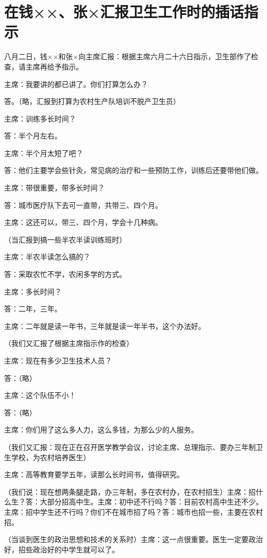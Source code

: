 \section[在钱××、张×汇报卫生工作时的插话指示（一九六五年八月二日）]{在钱××、张×汇报卫生工作时的插话指示}


八月二日，钱××和张×向主席汇报：根据主席六月二十六日指示，卫生部作了检查，请主席再给予指示。

主席：我要讲的都已讲了。你们打算怎么办？

答。（略，汇报到打算为农村生产队培训不脱产卫生员）

主席：训练多长时间？

答：半个月左右。

主席：半个月太短了吧？

答：他们主要学会些针灸，常见病的治疗和一些预防工作，训练后还要带他们做。

主席：带很重要，带多长时间？

答：城市医疗队下去可一直带，共带三、四个月。

主席：这还可以，带三、四个月，学会十几种病。

（当汇报到搞一些半农半读训练班时）

主席：半农半读怎么搞的？

答：采取农忙不学，农闲多学的方式。

主席：多长时间？

答：二年，三年。

主席：二年就是读一年书，三年就是读一年半书，这个办法好。

（我们又汇报了根据主席指示作的检查）

主席：现在有多少卫生技术人员？

答：（略）

主席：这个队伍不小！

答：（略）

主席：你们用了这么多人力，这么多钱，为那么少的人服务。

（我们又汇报：现在正在召开医学教学会议，讨论主席、总理指示、要办三年制卫生学校，为农村培养医生）

主席：高等教育要学五年，读那么长时间书，值得研究。

（我们说：现在想两条腿走路，办三年制，多在农村办，在农村招生）主席：招什么生？答：大部分招高中生。主席：初中还不行吗？答：目前农村高中生还不少。主席：招中学生还不行吗？你们不在城市招了吗？答：城市也招一些，主要在农村招。

（当谈到医生的政治思想和技术的关系时）主席：这一点很重要。医生一定要政治好，招些政治好的中学生就可以了。

